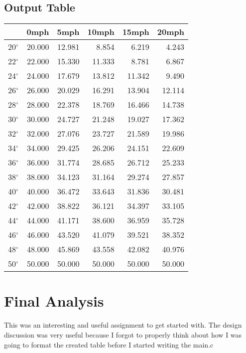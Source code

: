 \documentclass[letterpaper]{scrartcl}
\begin{document}
\subsection{Output Table}
\begin{tabular}{r|rrrrr}
 &0mph & 5mph & 10mph & 15mph & 20mph \\ \hline
20$^{\circ}$ &20.000 &12.981 &8.854 &6.219 &4.243 \\
22$^{\circ}$ &22.000 &15.330 &11.333 &8.781 &6.867 \\
24$^{\circ}$ &24.000 &17.679 &13.812 &11.342 &9.490 \\
26$^{\circ}$ &26.000 &20.029 &16.291 &13.904 &12.114 \\
28$^{\circ}$ &28.000 &22.378 &18.769 &16.466 &14.738 \\
30$^{\circ}$ &30.000 &24.727 &21.248 &19.027 &17.362 \\
32$^{\circ}$ &32.000 &27.076 &23.727 &21.589 &19.986 \\
34$^{\circ}$ &34.000 &29.425 &26.206 &24.151 &22.609 \\
36$^{\circ}$ &36.000 &31.774 &28.685 &26.712 &25.233 \\
38$^{\circ}$ &38.000 &34.123 &31.164 &29.274 &27.857 \\
40$^{\circ}$ &40.000 &36.472 &33.643 &31.836 &30.481 \\
42$^{\circ}$ &42.000 &38.822 &36.121 &34.397 &33.105 \\
44$^{\circ}$ &44.000 &41.171 &38.600 &36.959 &35.728 \\
46$^{\circ}$ &46.000 &43.520 &41.079 &39.521 &38.352 \\
48$^{\circ}$ &48.000 &45.869 &43.558 &42.082 &40.976 \\
50$^{\circ}$ &50.000 &50.000 &50.000 &50.000 &50.000 \\
\end{tabular}

\section{Final Analysis}
This was an interesting and useful assignment to get started with.
The design discussion was very useful because I forgot to properly
think about how I was going to format the created table before I started
writing the main.c
\end{document}
